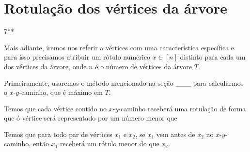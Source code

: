 \documentclass[a4paper,12pt]{article}
\begin{document}
	\section {Rotulação dos vértices da árvore} 7**

		Mais adiante, iremos nos referir a vértices com uma característica 
		específica e para isso precisamos atribuir um rótulo numérico $x\in [n]$ 
		distinto para cada um dos vértices da árvore, onde $n$ é o número de 
		vértices da árvore $T$.

		Primeiramente, usaremos o método mencionado na seção ___ para
		calcularmos o $x$-$y$-caminho, que é máximo em $T$.

		Temos que cada vértice contido no $x$-$y$-caminho receberá uma 
		rotulação de forma que ó vértice será representado por um número
		menor que 

		Temos que para todo par de vértices $x_1$ e $x_2$, se $x_1$ vem antes 
		de $x_2$ no $x$-$y$-caminho, então $x_1$ receberá um rótulo menor
		do que $x_2$.

	
	
\end{document}
